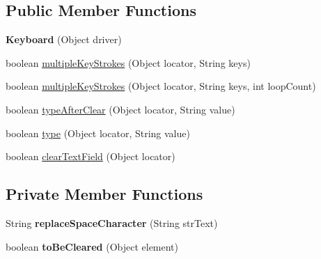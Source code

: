 \subsection*{Public Member Functions}
\begin{DoxyCompactItemize}
\item 
\hypertarget{classcom_1_1zeuslearning_1_1automation_1_1selenium_1_1interactions_1_1Keyboard_a168e016c9c5855f0b3e9d3947af30d8c}{}\label{classcom_1_1zeuslearning_1_1automation_1_1selenium_1_1interactions_1_1Keyboard_a168e016c9c5855f0b3e9d3947af30d8c} 
{\bfseries Keyboard} (Object driver)
\item 
boolean \hyperlink{classcom_1_1zeuslearning_1_1automation_1_1selenium_1_1interactions_1_1Keyboard_af0c2d93c6dca53eea5fe996df3f85af7}{multiple\+Key\+Strokes} (Object locator, String keys)
\item 
boolean \hyperlink{classcom_1_1zeuslearning_1_1automation_1_1selenium_1_1interactions_1_1Keyboard_a99da211274aa02b2c3611d1db275996f}{multiple\+Key\+Strokes} (Object locator, String keys, int loop\+Count)
\item 
boolean \hyperlink{classcom_1_1zeuslearning_1_1automation_1_1selenium_1_1interactions_1_1Keyboard_a2436faf2f5954d8e1d4cb326c7bb8e06}{type\+After\+Clear} (Object locator, String value)
\item 
boolean \hyperlink{classcom_1_1zeuslearning_1_1automation_1_1selenium_1_1interactions_1_1Keyboard_ac169af3cdaa7e24a4ec048c70540aaa1}{type} (Object locator, String value)
\item 
boolean \hyperlink{classcom_1_1zeuslearning_1_1automation_1_1selenium_1_1interactions_1_1Keyboard_aa50940a7a030455246ba1c3ee3d62d85}{clear\+Text\+Field} (Object locator)
\end{DoxyCompactItemize}
\subsection*{Private Member Functions}
\begin{DoxyCompactItemize}
\item 
\hypertarget{classcom_1_1zeuslearning_1_1automation_1_1selenium_1_1interactions_1_1Keyboard_ad00aa174a52ac5a81eae322d223cfdef}{}\label{classcom_1_1zeuslearning_1_1automation_1_1selenium_1_1interactions_1_1Keyboard_ad00aa174a52ac5a81eae322d223cfdef} 
String {\bfseries replace\+Space\+Character} (String str\+Text)
\item 
\hypertarget{classcom_1_1zeuslearning_1_1automation_1_1selenium_1_1interactions_1_1Keyboard_a224dfd5b655ec0b7e2c25f50fd3fab90}{}\label{classcom_1_1zeuslearning_1_1automation_1_1selenium_1_1interactions_1_1Keyboard_a224dfd5b655ec0b7e2c25f50fd3fab90} 
boolean {\bfseries to\+Be\+Cleared} (Object element)
\end{DoxyCompactItemize}
